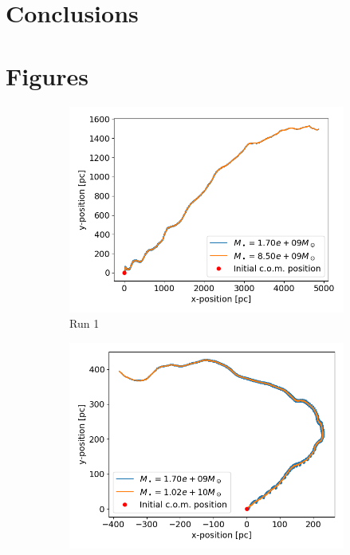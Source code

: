 \documentclass[english, oneside]{HYgradu}
\begin{document}
\begin{figure}
	\label{figure:profile_comparison}
\end{figure}


\chapter{Conclusions}

\appendix

\chapter{Figures}

\begin{figure}
	\centering
	\begin{subfigure}[b]{0.49\textwidth}
		\includegraphics[width=\textwidth]{Run1_Trajectory_small.png}
		\caption{Run 1}
	\end{subfigure}
	\begin{subfigure}[b]{0.49\textwidth}
		\includegraphics[width=\textwidth]{Run2_Trajectory_small.png}

\end{subfigure}
\end{figure}
\end{document}
